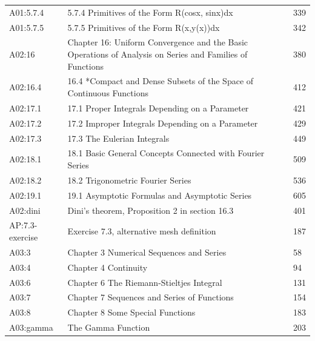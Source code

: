 \begin{longtable}{p{22mm}p{99mm}p{20mm}}
A01:5.7.4 & 5.7.4 Primitives of the Form R(cosx, sinx)dx & 339 \\

A01:5.7.5 & 5.7.5 Primitives of the Form R(x,y(x))dx & 342 \\

A02:16 & Chapter 16: Uniform Convergence and the Basic Operations of Analysis on Series and Families of Functions & 380 \\

A02:16.4 & 16.4 *Compact and Dense Subsets of the Space of Continuous Functions & 412 \\

A02:17.1 & 17.1 Proper Integrals Depending on a Parameter & 421 \\

A02:17.2 & 17.2 Improper Integrals Depending on a Parameter & 429 \\

A02:17.3 & 17.3 The Eulerian Integrals & 449 \\

A02:18.1 & 18.1 Basic General Concepts Connected with Fourier Series & 509 \\

A02:18.2 & 18.2 Trigonometric Fourier Series & 536 \\

A02:19.1 & 19.1 Asymptotic Formulas and Asymptotic Series & 605 \\

A02:dini & Dini's theorem, Proposition 2 in section 16.3 & 401 \\

AP:7.3-exercise & Exercise 7.3, alternative mesh definition & 187 \\

A03:3 & Chapter 3 Numerical Sequences and Series & 58 \\

A03:4 & Chapter 4 Continuity & 94 \\

A03:6 & Chapter 6 The Riemann-Stieltjes Integral & 131 \\

A03:7 & Chapter 7 Sequences and Series of Functions & 154 \\

A03:8 & Chapter 8 Some Special Functions & 183 \\

A03:gamma & The Gamma Function & 203 \\


\end{longtable}
